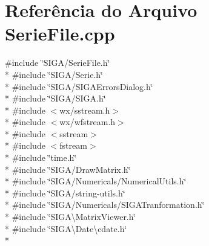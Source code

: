 \section{Referência do Arquivo Serie\+File.\+cpp}
\label{_serie_file_8cpp}
{\ttfamily \#include \char`\"{}S\+I\+G\+A/\+Serie\+File.\+h\char`\"{}}\\*
{\ttfamily \#include \char`\"{}S\+I\+G\+A/\+Serie.\+h\char`\"{}}\\*
{\ttfamily \#include \char`\"{}S\+I\+G\+A/\+S\+I\+G\+A\+Errors\+Dialog.\+h\char`\"{}}\\*
{\ttfamily \#include \char`\"{}S\+I\+G\+A/\+S\+I\+G\+A.\+h\char`\"{}}\\*
{\ttfamily \#include $<$wx/sstream.\+h$>$}\\*
{\ttfamily \#include $<$wx/wfstream.\+h$>$}\\*
{\ttfamily \#include $<$sstream$>$}\\*
{\ttfamily \#include $<$fstream$>$}\\*
{\ttfamily \#include \char`\"{}time.\+h\char`\"{}}\\*
{\ttfamily \#include \char`\"{}S\+I\+G\+A/\+Draw\+Matrix.\+h\char`\"{}}\\*
{\ttfamily \#include \char`\"{}S\+I\+G\+A/\+Numericals/\+Numerical\+Utils.\+h\char`\"{}}\\*
{\ttfamily \#include \char`\"{}S\+I\+G\+A/string-\/utils.\+h\char`\"{}}\\*
{\ttfamily \#include \char`\"{}S\+I\+G\+A/\+Numericals/\+S\+I\+G\+A\+Tranformation.\+h\char`\"{}}\\*
{\ttfamily \#include \char`\"{}S\+I\+G\+A\textbackslash{}\+Matrix\+Viewer.\+h\char`\"{}}\\*
{\ttfamily \#include \char`\"{}S\+I\+G\+A\textbackslash{}\+Date\textbackslash{}cdate.\+h\char`\"{}}\\*
